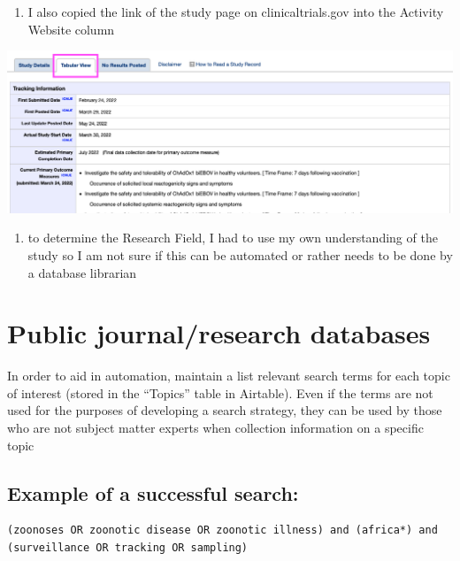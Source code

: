 \documentclass[
]{book}
\providecommand{\tightlist}{%
  \setlength{\itemsep}{0pt}\setlength{\parskip}{0pt}}
\begin{document}
\begin{enumerate}
\def\labelenumi{\arabic{enumi}.}
\setcounter{enumi}{17}
\tightlist
\item
  I also copied the link of the study page on clinicaltrials.gov into the Activity Website column
\end{enumerate}

\includegraphics{images/clinicaltrial8.png}

\begin{enumerate}
\def\labelenumi{\arabic{enumi}.}
\setcounter{enumi}{18}
\tightlist
\item
  to determine the Research Field, I had to use my own understanding of the study so I am not sure if this can be automated or rather needs to be done by a database librarian
\end{enumerate}

\hypertarget{update-public-research}{%
\section{Public journal/research databases}\label{update-public-research}}

In order to aid in automation, maintain a list relevant search terms for each topic of interest (stored in the ``Topics'' table in Airtable). Even if the terms are not used for the purposes of developing a search strategy, they can be used by those who are not subject matter experts when collection information on a specific topic

\hypertarget{example-of-a-successful-search}{%
\subsection{Example of a successful search:}\label{example-of-a-successful-search}}

\begin{verbatim}
(zoonoses OR zoonotic disease OR zoonotic illness) and (africa*) and (surveillance OR tracking OR sampling)
\end{verbatim}
\end{document}
